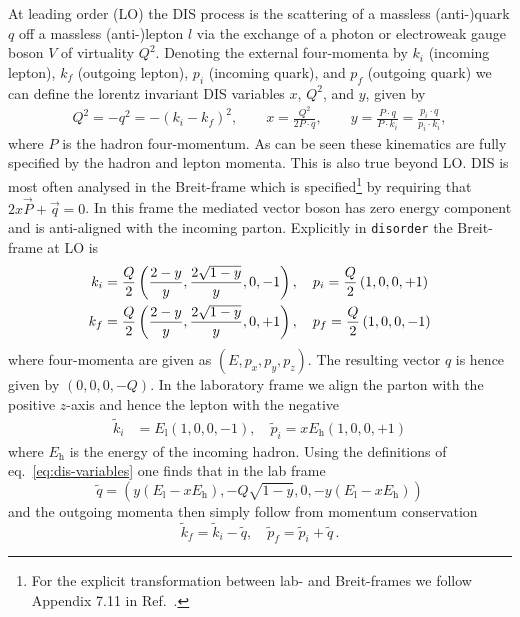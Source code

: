 \documentclass[submission, PhysCodeb]{SciPost}
\newcommand{\disorder}{{\tt disorder}}
\begin{document}
At leading order (LO) the DIS process is
the scattering of a massless (anti-)quark $q$ off a massless
\mbox{(anti-)lepton} $l$ via the exchange of a photon or electroweak
gauge boson $V$ of virtuality $Q^2$. Denoting the external
four-momenta by $k_i$ (incoming lepton), $k_f$ (outgoing lepton),
$p_i$ (incoming quark), and $p_f$ (outgoing quark) we can define the
lorentz invariant DIS variables $x$, $Q^2$, and $y$, given by
\begin{align}
  Q^2 = -q^2 = -(k_i - k_f)^2, \qquad  x = \frac{Q^2}{2 P \cdot q},
  \qquad  y = \frac{P \cdot q}{P \cdot k_i} = \frac{p_i \cdot q}{p_i \cdot k_i} ,
  \label{eq:dis-variables}
\end{align}
where $P$ is the hadron four-momentum. As can be seen these kinematics
are fully specified by the hadron and lepton momenta. This is also
true beyond LO. DIS is most often analysed in the Breit-frame
which is specified\footnote{For the explicit transformation between
lab- and Breit-frames we follow Appendix 7.11 in
Ref.~\cite{Devenish:2004pb}.}  by requiring that $2 x \vec{P} +
\vec{q} = 0$. In this frame the mediated vector boson has zero energy
component and is anti-aligned with the incoming parton. Explicitly in
\disorder{} the Breit-frame at LO is
\begin{align}
  \label{eq:BreitLO}
k_i &= \frac{Q}{2}\left(\frac{2-y}{y},\frac{2\sqrt{1-y}}{y},0,-1 \right), \quad  p_i = \frac{Q}{2}\left(1,0,0,+1 \right) \\ \notag
k_f &= \frac{Q}{2}\left(\frac{2-y}{y},\frac{2\sqrt{1-y}}{y},0,+1 \right), \quad  p_f = \frac{Q}{2}\left(1,0,0,-1 \right) 
\end{align}
where four-momenta are given as $(E,p_x,p_y,p_z)$. The resulting
vector $q$ is hence given by $(0,0,0,-Q)$. In the laboratory frame we align
the parton with the positive $z$-axis and hence the lepton with the
negative
\begin{align}
\tilde{k}_i &= E_\mathrm{l}\left(1,0,0,-1 \right), \quad  \tilde{p}_i = x E_\mathrm{h}\left(1,0,0,+1 \right) 
\end{align}
where $E_\mathrm{h}$ is the energy of the incoming hadron. Using the
definitions of eq.~\eqref{eq:dis-variables} one finds that in the lab
frame
\begin{equation}
  \tilde{q} = \left(y(E_\mathrm{l} - x E_\mathrm{h}), -Q\sqrt{1-y},0, -y(E_\mathrm{l} - x E_\mathrm{h})\right) 
\end{equation}
and the outgoing momenta then simply follow from momentum conservation
\begin{equation}
  \label{eq:LabLO}
  \tilde{k}_f = \tilde{k}_i - \tilde{q}, \quad   \tilde{p}_f = \tilde{p}_i + \tilde{q}\,. 
\end{equation}
\end{document}

